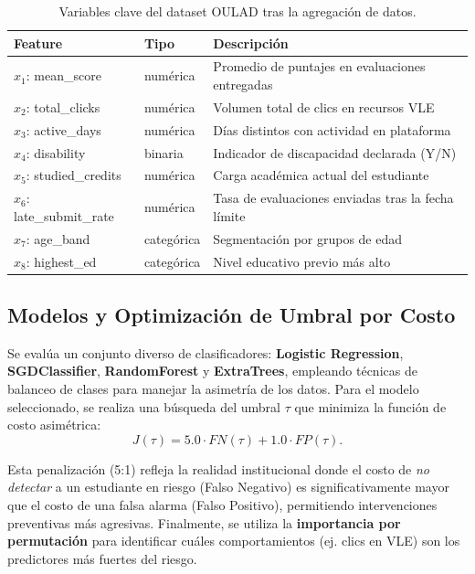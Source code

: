 \documentclass[12pt,twoside]{report}
\theoremstyle{definition}
\begin{document}
\begin{table}[H]
\centering
\caption{Variables clave del dataset OULAD tras la agregaci\'on de datos.}
\label{tab:features}
\begin{tabular}{lll}
\toprule
\textbf{Feature} & \textbf{Tipo} & \textbf{Descripci\'on} \\
\midrule
$x_1$: mean\_score & num\'erica & Promedio de puntajes en evaluaciones entregadas \\
$x_2$: total\_clicks & num\'erica & Volumen total de clics en recursos VLE \\
$x_3$: active\_days & num\'erica & D\'ias distintos con actividad en plataforma \\
$x_4$: disability & binaria & Indicador de discapacidad declarada (Y/N) \\
$x_5$: studied\_credits & num\'erica & Carga acad\'emica actual del estudiante \\
$x_6$: late\_submit\_rate & num\'erica & Tasa de evaluaciones enviadas tras la fecha l\'imite \\
$x_7$: age\_band & categ\'orica & Segmentaci\'on por grupos de edad \\
$x_8$: highest\_ed & categ\'orica & Nivel educativo previo m\'as alto \\
\bottomrule
\end{tabular}
\end{table}

\subsection{Modelos y Optimizaci\'on de Umbral por Costo}

Se eval\'ua un conjunto diverso de clasificadores: \textbf{Logistic Regression}, \textbf{SGDClassifier}, \textbf{RandomForest} y \textbf{ExtraTrees}, empleando t\'ecnicas de balanceo de clases para manejar la asimetr\'ia de los datos. Para el modelo seleccionado, se realiza una b\'usqueda del umbral $\tau$ que minimiza la funci\'on de costo asim\'etrica:
\begin{equation}
J(\tau) = 5.0 \cdot FN(\tau) + 1.0 \cdot FP(\tau).
\end{equation}

Esta penalizaci\'on (5:1) refleja la realidad institucional donde el costo de \emph{no detectar} a un estudiante en riesgo (Falso Negativo) es significativamente mayor que el costo de una falsa alarma (Falso Positivo), permitiendo intervenciones preventivas m\'as agresivas. Finalmente, se utiliza la \textbf{importancia por permutaci\'on} para identificar cu\'ales comportamientos (ej. clics en VLE) son los predictores m\'as fuertes del riesgo.
\end{document}
